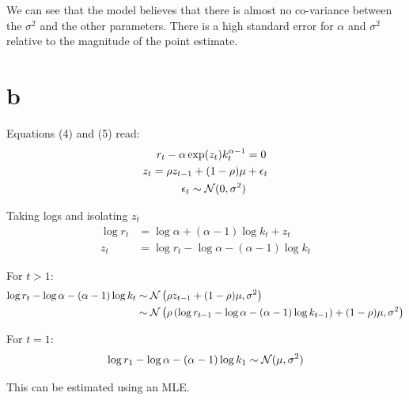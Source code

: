 \documentclass[12pt, letterpaper]{paper}
\begin{document}
We can see that the model believes that there is almost no co-variance
between the \(\sigma^2\) and the other parameters. There is a high standard
error for \(\alpha\) and \(\sigma^2\) relative to the magnitude of the point
estimate. 

\section{b}
\label{sec:orgfb4996d}

Equations (4) and (5) read:
\begin{align*}
  r_t - \alpha \exp( z_t ) k_t^{\alpha -1 } &= 0\\
  z_t = \rho z_{t-1} + (1-\rho)\mu &+ \epsilon_t\\
  \epsilon_t \sim \mathcal{N}( 0, \sigma^2)
\end{align*}

Taking logs and isolating $z_t$
\begin{align*}
  \log r_t  &= \log \alpha + (\alpha-1) \log k_t + z_t\\
  z_t &=  \log r_t - \log \alpha - (\alpha-1) \log k_t
\end{align*}

For $t > 1$:
\begin{align*}
  \log r_t - \log \alpha - (\alpha-1) \log k_t &\sim \mathcal{N}\left( \rho z_{t-1} +
                                       (1-\rho)\mu, \sigma^2 \right)\\
  &\sim \mathcal{N}\left( \rho\left( \log r_{t-1} - \log \alpha - (\alpha-1)\log k_{t-1}
    \right) + (1-\rho)\mu, \sigma^2 \right)
\end{align*}

For $t = 1$:
\begin{equation*}
  \log r_1 - \log \alpha - (\alpha-1)\log k_1 \sim \mathcal{N}( \mu, \sigma^2)
\end{equation*}

This can be estimated using an MLE.
\end{document}
